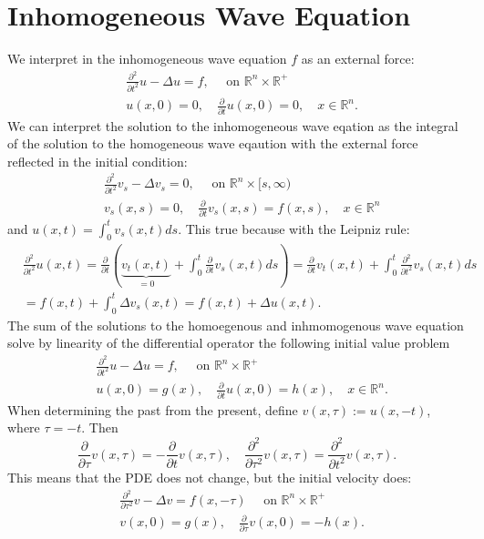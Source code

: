\documentclass[A4,12pt,twoside]{book}
\begin{document}
\section{Inhomogeneous Wave Equation}
We interpret in the inhomogeneous wave equation $f$ as an external force:
\begin{align*}
   &\frac{\partial^2}{\partial t^2} u - \Delta u =f, \quad \text{ on } \mathbb{R}^n \times \mathbb{R}^+\\
   &u(x,0)=0, \quad \frac{\partial}{\partial t} u(x,0) =0, \quad x \in \mathbb{R}^n.
\end{align*}
We can interpret the solution to the inhomogeneous wave eqation as the integral of the solution to the homogeneous wave eqaution with the external force reflected in the initial condition: 
\begin{align*}
    & \frac{\partial^2}{\partial t^2} v_s- \Delta v_s =0, \quad \text{ on } \mathbb{R}^n \times [s, \infty)\\
    &v_s(x,s)=0, \quad \frac{\partial}{\partial t} v_s(x,s) =f(x,s), \quad x \in \mathbb{R}^n
\end{align*}
and $u(x,t) = \int_0^t v_s (x,t) ds$. This true because with the Leipniz rule:
\begin{align*}
    &\frac{\partial^2}{\partial t^2} u(x,t) = \frac{\partial}{\partial t} \left( \underbrace{v_t(x,t)}_{=0} + \int_0^t \frac{\partial}{\partial t} v_s (x,t) ds \right) = \frac{\partial}{\partial t} v_t(x,t) + \int_0^t \frac{\partial^2}{\partial t^2} v_s (x,t) ds \\
    &= f(x,t) + \int_0^t \Delta v_s (x,t) = f(x,t) + \Delta u(x,t).
\end{align*}
The sum of the solutions to the homoegenous and inhmomogenous wave equation solve by linearity of the differential operator the following initial value problem 
\begin{align*}
      &\frac{\partial^2}{\partial t^2} u - \Delta u =f, \quad \text{ on } \mathbb{R}^n \times \mathbb{R}^+\\
   &u(x,0)=g(x), \quad \frac{\partial}{\partial t} u(x,0) =h(x), \quad x \in \mathbb{R}^n.
\end{align*}
When determining the past from the present, define $v(x,\tau) := u(x,-t)$, where $\tau = - t$. Then 
\[
\frac{\partial}{\partial \tau} v(x,\tau) = - \frac{\partial}{\partial t} v(x,\tau), \quad \frac{\partial^2}{\partial \tau^2} v(x,\tau) =  \frac{\partial^2}{\partial t^2} v(x,\tau).
\]
This means that the PDE does not change, but the initial velocity does: 
\begin{align*}
    &\frac{\partial^2}{\partial \tau^2} v - \Delta v= f(x,-\tau) \quad \text{ on } \mathbb{R}^n \times \mathbb{R}^+\\
    & v(x,0) = g(x), \quad \frac{\partial}{\partial \tau} v(x,0) = -h(x).
\end{align*}
\end{document}

